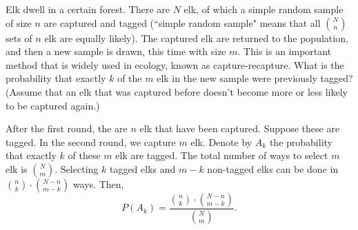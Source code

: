 
\setcounter{theorem}{15}
\begin{exercise}[BH.1.31]
	Elk dwell in a certain forest. There are $N$ elk, of which a simple random sample of size $n$ are captured and tagged (``simple random sample" means that all $\binom{N}{n}$ sets of $n$ elk are equally likely). The captured elk are returned to the population, and then a new sample is drawn, this time with size $m$. This is an important method that is widely used in ecology, known as capture-recapture. What is the probability that exactly $k$ of the $m$ elk in the new sample were previously tagged? (Assume that an elk that was captured before doesn’t become more or less likely to be captured again.)
\begin{solution}
	After the first round, the are $n$ elk that have been captured. Suppose these are tagged. In the second round, we capture $m$ elk. Denote by $A_{k}$ the probability that exactly $k$ of these $m$ elk are tagged. The total number of ways to select $m$ elk is ${N \choose m}$. Selecting $k$ tagged elks and $m-k$ non-tagged elks can be done in ${n \choose k}\cdot {N-n \choose m-k}$ ways. Then, $$P(A_k) = \frac{{n \choose k}\cdot {N-n \choose m-k}}{{N \choose m}}.$$
\end{solution}
\end{exercise}


